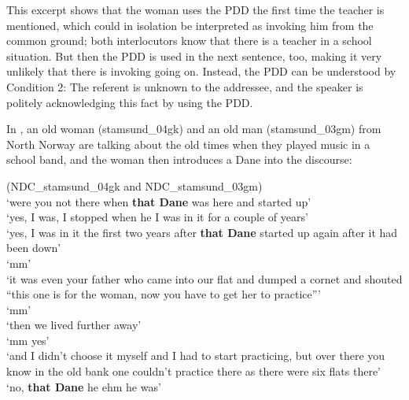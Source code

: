 \documentclass[output=paper,colorlinks,citecolor=brown]{langscibook}
\begin{document}
This excerpt shows that the woman uses the PDD the first time the teacher is mentioned, which could in isolation be interpreted as invoking him from the common ground; both interlocutors know that there is a teacher in a school situation. But then the PDD is used in the next sentence, too, making it very unlikely that there is invoking going on. Instead, the PDD can be understood by Condition 2: The referent is unknown to the addressee, and the speaker is politely acknowledging this fact by using the PDD.

In , an old woman (stamsund\_04gk) and an old man (stamsund\_03gm) from North Norway are talking about the old times when they played music in a school band, and the woman then introduces a Dane into the discourse: 

\ea\label{ex:johannessen:31} {(NDC\_stamsund\_04gk and NDC\_stamsund\_03gm)}
 \\
\glt ‘were you not there when \textbf{that Dane} was here and started up’
\\
\glt ‘yes, I was, I stopped when he I was in it for a couple of years’
\\
\glt ‘yes, I was in it the first two years after \textbf{that Dane} started up again after it had been down’
\\
\glt ‘mm’
\\
\glt ‘it was even your father who came into our flat and dumped a cornet and shouted “this one is for the woman, now you have to get her to practice”’
\\
\glt ‘mm’
 \\
\glt ‘then we lived further away’
\\
\glt ‘mm yes’
 \\
\glt ‘and I didn’t choose it myself and I had to start practicing, but over there you know in the old bank one couldn’t practice there as there were six flats there’
\\
\glt ‘no, \textbf{that Dane} he ehm he was’
\z
\z
\end{document}
